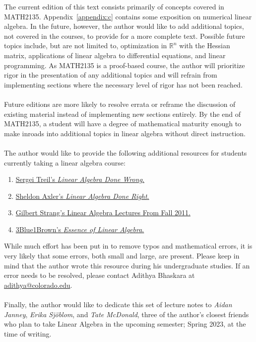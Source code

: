 The current edition of this text consists primarily of concepts covered in MATH2135. Appendix~\ref{appendix:c} contains some exposition on numerical linear algebra. In the future, however, the author would like to add additional topics, not covered in the courses, to provide for a more complete text. Possible future topics include, but are not limited to, optimization in \(\mathbb{R}^n\) with the Hessian matrix, applications of linear algebra to differential equations, and linear programming. As MATH2135 is a proof-based course, the author will prioritize rigor in the presentation of any additional topics and will refrain from implementing sections where the necessary level of rigor has not been reached.
\\
\\
Future editions are more likely to resolve errata or reframe the discussion of existing material instead of implementing new sections entirely. By the end of MATH2135, a student will have a degree of mathematical maturity enough to make inroads into additional topics in linear algebra without direct instruction.
\pagebreak
\vphantom
\\
\\
The author would like to provide the following additional resources for students currently taking a linear algebra course:
\begin{enumerate}
    \item \href{https://www.math.brown.edu/streil/papers/LADW/LADW_2017-09-04.pdf}{Sergei Treil's \textit{Linear Algebra Done Wrong}.}
    \item \href{https://linear.axler.net/LADR4e.pdf}{Sheldon Axler's \textit{Linear Algebra Done Right}.}
    \item \href{https://youtube.com/playlist?list=PL221E2BBF13BECF6C}{Gilbert Strang's Linear Algebra Lectures From Fall 2011.}
    \item \href{https://www.youtube.com/playlist?app=desktop&list=PLZHQObOWTQDPD3MizzM2xVFitgF8hE_ab}{3Blue1Brown's \textit{Essence of Linear Algebra}.}
\end{enumerate}
While much effort has been put in to remove typos and mathematical errors, it is very likely that some errors, both small and large, are present. Please keep in mind that the author wrote this resource during his undergraduate studies. If an error needs to be resolved, please contact Adithya Bhaskara at \href{mailto:adithya@colorado.edu}{adithya@colorado.edu}.
\\
\\
Finally, the author would like to dedicate this set of lecture notes to \textit{Aidan Janney}, \textit{Erika Sj\"{o}blom}, and \textit{Tate McDonald}, three of the author's closest friends who plan to take Linear Algebra in the upcoming semester; Spring 2023, at the time of writing.
\\
\\
\vfill
{}